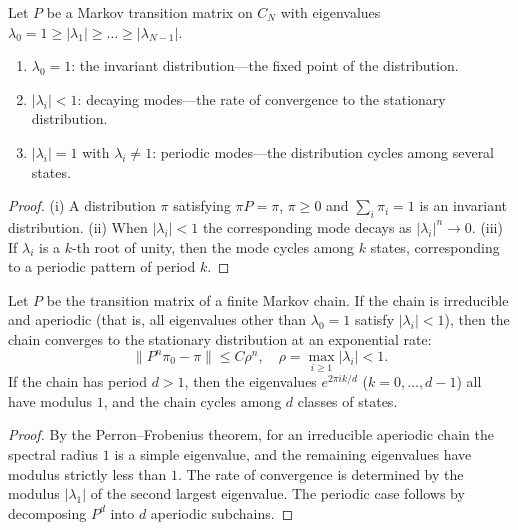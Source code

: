 \begin{proposition}\label{prop:transfer_operator_eigen}
Let $P$ be a Markov transition matrix on $C_N$ with eigenvalues $\lambda_0 = 1 \ge |\lambda_1| \ge \dots \ge |\lambda_{N-1}|$.
\begin{enumerate}[label=(\roman*)]
    \item $\lambda_0 = 1$: the invariant distribution---the fixed point of the distribution.
    \item $|\lambda_i| < 1$: decaying modes---the rate of convergence to the stationary distribution.
    \item $|\lambda_i| = 1$ with $\lambda_i \neq 1$: periodic modes---the distribution cycles among several states.
\end{enumerate}
\end{proposition}

\begin{proof}
(i) A distribution $\pi$ satisfying $\pi P = \pi$, $\pi \ge 0$ and $\sum_i \pi_i = 1$ is an invariant distribution. (ii) When $|\lambda_i| < 1$ the corresponding mode decays as $|\lambda_i|^n \to 0$. (iii) If $\lambda_i$ is a $k$-th root of unity, then the mode cycles among $k$ states, corresponding to a periodic pattern of period $k$.
\end{proof}

\begin{proposition}\label{prop:markov_chain_period}
Let $P$ be the transition matrix of a finite Markov chain. If the chain is irreducible and aperiodic (that is, all eigenvalues other than $\lambda_0=1$ satisfy $|\lambda_i|<1$), then the chain converges to the stationary distribution at an exponential rate:
\[
\|P^n \pi_0 - \pi\| \le C \rho^n, \quad \rho = \max_{i \ge 1} |\lambda_i| < 1.
\]
If the chain has period $d > 1$, then the eigenvalues $e^{2\pi i k/d}$ ($k=0,\dots,d-1$) all have modulus $1$, and the chain cycles among $d$ classes of states.
\end{proposition}

\begin{proof}
By the Perron--Frobenius theorem, for an irreducible aperiodic chain the spectral radius $1$ is a simple eigenvalue, and the remaining eigenvalues have modulus strictly less than $1$. The rate of convergence is determined by the modulus $|\lambda_1|$ of the second largest eigenvalue. The periodic case follows by decomposing $P^d$ into $d$ aperiodic subchains.
\end{proof}

